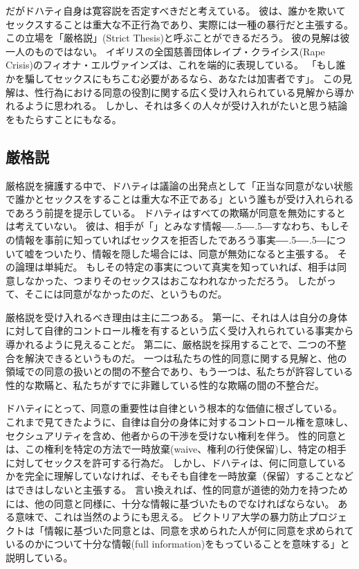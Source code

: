 \documentclass[paper=a4,book,openany]{jlreq}
\def\DDASH{―\kern-.5\zw―\kern-.5\zw―} %
\begin{document}
だがドハティ自身は寛容説を否定すべきだと考えている。
彼は、誰かを欺いてセックスすることは重大な不正行為であり、実際には一種の暴行だと主張する。
この立場を「厳格説」(Strict Thesis)と呼ぶことができるだろう。
彼の見解は彼一人のものではない。
イギリスの全国慈善団体レイプ・クライシス(Rape Crisis)のフィオナ・エルヴァインズは、これを端的に表現している。
「もし誰かを騙してセックスにもちこむ必要があるなら、あなたは加害者です」\citep{sanghani14:_lied_your_way_sex}。
この見解は、性行為における同意の役割に関する広く受け入れられている見解から導かれるように思われる。
しかし、それは多くの人々が受け入れがたいと思う結論をもたらすことにもなる。

\subsection{厳格説}

厳格説を擁護する中で、ドハティは議論の出発点として「正当な同意がない状態で誰かとセックスをすることは重大な不正である」という誰もが受け入れられるであろう前提を提示している\citep[p.722]{dougherty13:_sex_lies_consen}。
ドハティはすべての欺瞞が同意を無効にするとは考えていない。
彼は、相手が「」とみなす情報{\DDASH}すなわち、もしその情報を事前に知っていればセックスを拒否したであろう事実{\DDASH}について嘘をついたり、情報を隠した場合には、同意が無効になると主張する。
その論理は単純だ。
もしその特定の事実について真実を知っていれば、相手は同意しなかった、つまりそのセックスはおこなわれなかっただろう。
したがって、そこには同意がなかったのだ、というものだ。

厳格説を受け入れるべき理由は主に二つある。
第一に、それは人は自分の身体に対して自律的コントロール権を有するという広く受け入れられている事実から導かれるように見えることだ。
第二に、厳格説を採用することで、二つの不整合を解決できるというものだ。
一つは私たちの性的同意に関する見解と、他の領域での同意の扱いとの間の不整合であり、もう一つは、私たちが許容している性的な欺瞞と、私たちがすでに非難している性的な欺瞞の間の不整合だ。

ドハティにとって、同意の重要性は自律という根本的な価値に根ざしている。
これまで見てきたように、自律は自分の身体に対するコントロール権を意味し、セクシュアリティを含め、他者からの干渉を受けない権利を伴う。
性的同意とは、この権利を特定の方法で一時放棄(waive、権利の行使保留)し、特定の相手に対してセックスを許可する行為だ。
しかし、ドハティは、何に同意しているかを完全に理解していなければ、そもそも自律を一時放棄（保留）することなどはできはしないと主張する。
言い換えれば、性的同意が道徳的効力を持つためには、他の同意と同様に、十分な情報に基づいたものでなければならない。
ある意味で、これは当然のようにも思える。
ビクトリア大学の暴力防止プロジェクトは「情報に基づいた同意とは、同意を求められた人が何に同意を求められているのかについて十分な情報(full information)をもっていることを意味する」と説明している\citep{project25:_consen}。
\end{document}
